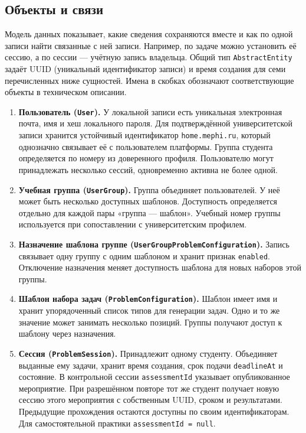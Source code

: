 \documentclass[12pt,a4paper]{article}
\newcommand{\tightlist}{\setlength{\itemsep}{0pt}\setlength{\parskip}{0pt}}
\begin{document}
\subsection{Объекты и связи}\label{ux43eux431ux44aux435ux43aux442ux44b-ux438-ux441ux432ux44fux437ux438}

\hypertarget{объекты-и-связи}{}

Модель данных показывает, какие сведения сохраняются вместе и как по одной записи найти связанные с ней записи. Например, по задаче можно установить её сессию, а по сессии --- учётную запись владельца. Общий тип \texttt{Abstract\allowbreak{}Entity} задаёт UUID (уникальный идентификатор записи) и время создания для семи перечисленных ниже сущностей. Имена в скобках обозначают соответствующие объекты в техническом описании.

\begin{enumerate}
\def\labelenumi{\arabic{enumi}.}
\tightlist
\item
  \textbf{Пользователь (\texttt{User}).} У локальной записи есть уникальная электронная почта, имя и хеш локального пароля. Для подтверждённой университетской записи хранится устойчивый идентификатор \texttt{home.\allowbreak{}mephi.\allowbreak{}ru}, который однозначно связывает её с пользователем платформы. Группа студента определяется по номеру из доверенного профиля. Пользователю могут принадлежать несколько сессий, одновременно активна не более одной.
\item
  \textbf{Учебная группа (\texttt{UserGroup}).} Группа объединяет пользователей. У неё может быть несколько доступных шаблонов. Доступность определяется отдельно для каждой пары «группа --- шаблон». Учебный номер группы используется при сопоставлении с университетским профилем.
\item
  \textbf{Назначение шаблона группе (\texttt{User\allowbreak{}Group\allowbreak{}Problem\allowbreak{}Configuration}).} Запись связывает одну группу с одним шаблоном и хранит признак \texttt{enabled}. Отключение назначения меняет доступность шаблона для новых наборов этой группы.
\item
  \textbf{Шаблон набора задач (\texttt{Problem\allowbreak{}Configuration}).} Шаблон имеет имя и хранит упорядоченный список типов для генерации задач. Одно и то же значение может занимать несколько позиций. Группы получают доступ к шаблону через назначения.
\item
  \textbf{Сессия (\texttt{Problem\allowbreak{}Session}).} Принадлежит одному студенту. Объединяет выданные ему задачи, хранит время создания, срок подачи \texttt{deadlineAt} и состояние. В контрольной сессии \texttt{assessment\allowbreak{}Id} указывает опубликованное мероприятие. При разрешённом повторе тот же студент получает новую сессию этого мероприятия с собственным UUID, сроком и результатами. Предыдущие прохождения остаются доступны по своим идентификаторам. Для самостоятельной практики \texttt{assessment\allowbreak{}Id =\allowbreak{} null}.

\end{enumerate}
\end{document}
